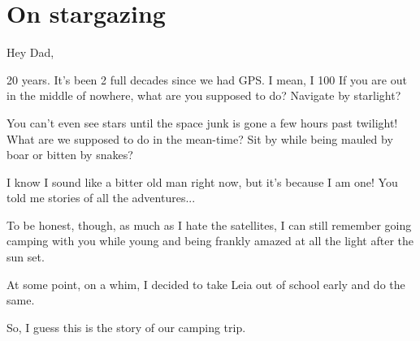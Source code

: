 \section*{On stargazing}

\noindent Hey Dad,

20 years.
It's been 2 full decades since we had GPS.
I mean, I 100%
If you are out in the middle of nowhere, what are you supposed to do?
Navigate by starlight? 

You can't even see stars until the space junk is gone a few hours past twilight!
What are we supposed to do in the mean-time?
Sit by while being mauled by boar or bitten by snakes?

I know I sound like a bitter old man right now, but it's because I am one!
You told me stories of all the adventures...

To be honest, though, as much as I hate the satellites, I can still remember going camping with you while young and being frankly amazed at all the light after the sun set.

At some point, on a whim, I decided to take Leia out of school early and do the same.

So, I guess this is the story of our camping trip.
